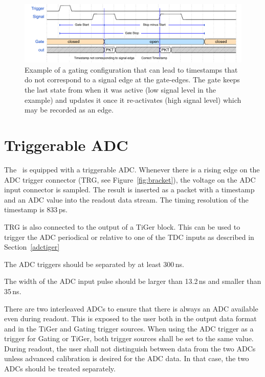 {    \begin{figure}[tbh]
        \centering
        \includegraphics[width=1.0\linewidth]{figures/gating_caveat.pdf}
        \caption{Example of a gating configuration that can lead to 
            timestamps that do not correspond to a signal edge at the 
            gate-edges. 
            The gate keeps the last state from when it was active (low signal
            level in the example) and updates it once it re-activates 
            (high signal level) which may be recorded as an edge.}
        \label{fig:gatingcaviat}
    \end{figure}

        
    \section{Triggerable ADC}
    \label{adc}
    The \deviceName\ is equipped with a triggerable ADC.  Whenever there is a
    rising edge on the ADC trigger connector (TRG, see
    Figure~\ref{fig:bracket}), the voltage on the ADC input connector is
    sampled. The result is inserted as a packet with a timestamp and an ADC
    value into the readout data stream. The timing resolution of the timestamp
	is 833\,ps.

    TRG is also connected to the output of a TiGer block.  This
    can be used  to trigger the ADC periodical or relative to one of the TDC
    inputs as described in Section~\ref{adctiger}

    The ADC triggers should be separated by at least 300\,ns.

    The width of the ADC input pulse should be larger than 13.2\,ns and
    smaller than 35\,ns.

    There are two interleaved ADCs to ensure that there is always an ADC
    available even during readout. This is exposed to the user both in the
    output data format and in the TiGer and Gating trigger sources.  When
    using the ADC trigger as a trigger for Gating or TiGer, both trigger
    sources shall be set to the same value.  During readout, the user shall
    not distinguish between data from the two ADCs unless advanced calibration
    is desired for the ADC data. In that case, the two ADCs should be treated
    separately.   
}{}